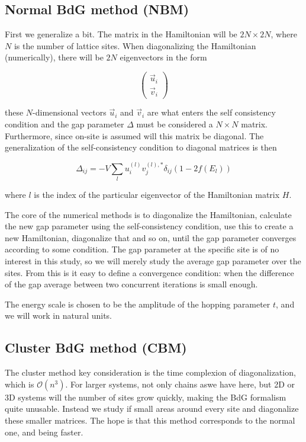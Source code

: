 \documentclass[11pt]{article}
\begin{document}
\subsection{ Normal BdG method (NBM) }

First we generalize a bit. The matrix in the Hamiltonian will be $2N \times 2N$, where $N$ is the number of lattice sites. When diagonalizing the Hamiltonian (numerically), there will be $2N$ eigenvectors in the form

\begin{equation}
	\begin{pmatrix} \vec{u}_i \\ \vec{v}_i \end{pmatrix} 
\end{equation}

these $N$-dimensional vectors $\vec{u}_i$ and $\vec{v}_i$ are what enters the self consistency condition and the gap parameter $\Delta$ must be considered a $N\times N$ matrix. Furthermore, since on-site is assumed will this matrix be diagonal. The generalization of the self-consistency condition to diagonal matrices is then

\begin{equation}
	\Delta_{ij} = -V \sum_l u_i^{(l)} v_j^{(l),*} \delta_{ij} (1 - 2f(E_l))
\end{equation}

where $l$ is the index of the particular eigenvector of the Hamiltonian matrix $H$. 

The core of the numerical methods is to diagonalize the Hamiltonian, calculate the new gap parameter using the self-consistency condition, use this to create a new Hamiltonian, diagonalize that and so on, until the gap parameter converges according to some condition. The gap parameter at the specific site is of no interest in this study, so we will merely study the average gap parameter over the sites. From this is it easy to define a convergence condition: when the difference of the gap average between two concurrent iterations is small enough. 

The energy scale is chosen to be the amplitude of the hopping parameter $t$, and we will work in natural units. 

\subsection{Cluster BdG method (CBM) }

The cluster method key consideration is the time complexion of diagonalization, which is $\mathcal{O}(n^3)$. For larger systems, not only chains aswe have here, but 2D or 3D systems will the number of sites grow quickly, making the BdG formalism quite unusable. Instead we study if small areas around every site and diagonalize these smaller matrices. The hope is that this method corresponds to the normal one, and being faster. 
\end{document}
